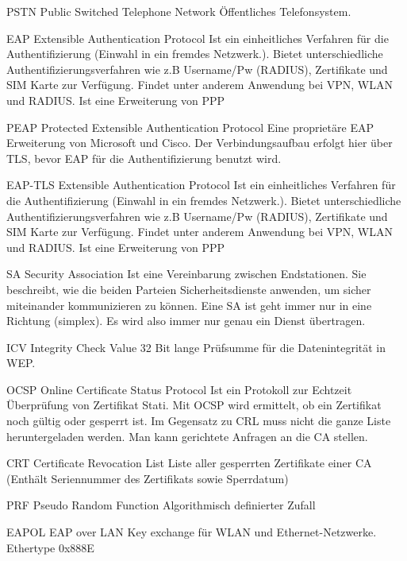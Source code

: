 {PSTN}
{Public Switched Telephone Network}
{
	Öffentliches Telefonsystem.
}

{EAP}
{Extensible Authentication Protocol}
{
	Ist ein einheitliches Verfahren für die Authentifizierung (Einwahl in ein fremdes Netzwerk.). Bietet unterschiedliche Authentifizierungsverfahren wie z.B Username/Pw (RADIUS), Zertifikate und SIM Karte zur Verfügung. Findet unter anderem Anwendung bei VPN, WLAN und RADIUS. Ist eine Erweiterung von PPP
}

{PEAP}
{Protected Extensible Authentication Protocol}
{
	Eine proprietäre EAP Erweiterung von Microsoft und Cisco. Der Verbindungsaufbau erfolgt hier über TLS, bevor EAP für die Authentifizierung benutzt wird.
}

{EAP-TLS}
{Extensible Authentication Protocol}
{
	Ist ein einheitliches Verfahren für die Authentifizierung (Einwahl in ein fremdes Netzwerk.). Bietet unterschiedliche Authentifizierungsverfahren wie z.B Username/Pw (RADIUS), Zertifikate und SIM Karte zur Verfügung. Findet unter anderem Anwendung bei VPN, WLAN und RADIUS. Ist eine Erweiterung von PPP
}


{SA}
{Security Association }
{
	Ist eine Vereinbarung zwischen Endstationen. Sie beschreibt, wie die beiden Parteien Sicherheitsdienste anwenden, um sicher miteinander kommunizieren zu können. Eine SA ist geht immer nur in eine Richtung (simplex). Es wird also immer nur genau ein Dienst übertragen.
}

{ICV}
{Integrity Check Value}
{
	32 Bit lange Prüfsumme für die Datenintegrität in WEP.
}

{OCSP}
{Online Certificate Status Protocol}
{
	Ist ein Protokoll zur Echtzeit Überprüfung von Zertifikat Stati. Mit OCSP wird ermittelt, ob ein Zertifikat noch gültig oder gesperrt ist. Im Gegensatz zu CRL muss nicht die ganze Liste heruntergeladen werden. Man kann gerichtete Anfragen an die CA stellen.
}

{CRT}
{Certificate Revocation List}
{
	Liste aller gesperrten Zertifikate einer CA (Enthält Seriennummer des Zertifikats sowie Sperrdatum)
}

{PRF}
{Pseudo Random Function}
{
	Algorithmisch definierter Zufall
}

{EAPOL}
{EAP over LAN}
{
	Key exchange für WLAN und Ethernet-Netzwerke. Ethertype 0x888E
}

